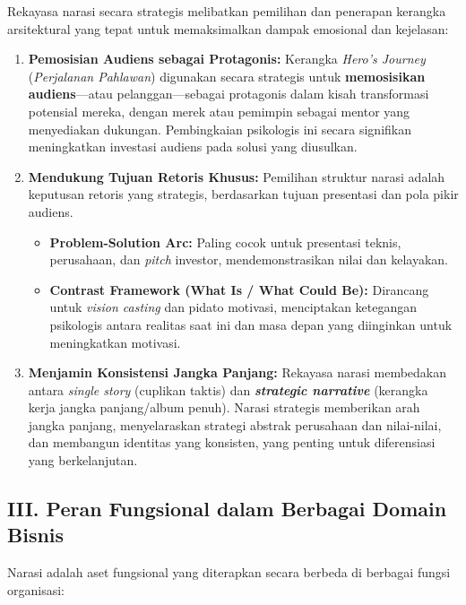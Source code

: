 \documentclass[
  letterpaper,
  DIV=11,
  numbers=noendperiod]{scrreprt}
\providecommand{\tightlist}{%
  \setlength{\itemsep}{0pt}\setlength{\parskip}{0pt}}
\begin{document}
Rekayasa narasi secara strategis melibatkan pemilihan dan penerapan
kerangka arsitektural yang tepat untuk memaksimalkan dampak emosional
dan kejelasan:

\begin{enumerate}
\def\labelenumi{\arabic{enumi}.}
\tightlist
\item
  \textbf{Pemosisian Audiens sebagai Protagonis:} Kerangka \emph{Hero's
  Journey} (\emph{Perjalanan Pahlawan}) digunakan secara strategis untuk
  \textbf{memosisikan audiens}---atau pelanggan---sebagai protagonis
  dalam kisah transformasi potensial mereka, dengan merek atau pemimpin
  sebagai mentor yang menyediakan dukungan. Pembingkaian psikologis ini
  secara signifikan meningkatkan investasi audiens pada solusi yang
  diusulkan.
\item
  \textbf{Mendukung Tujuan Retoris Khusus:} Pemilihan struktur narasi
  adalah keputusan retoris yang strategis, berdasarkan tujuan presentasi
  dan pola pikir audiens.

  \begin{itemize}
  \tightlist
  \item
    \textbf{Problem-Solution Arc:} Paling cocok untuk presentasi teknis,
    perusahaan, dan \emph{pitch} investor, mendemonstrasikan nilai dan
    kelayakan.
  \item
    \textbf{Contrast Framework (What Is / What Could Be):} Dirancang
    untuk \emph{vision casting} dan pidato motivasi, menciptakan
    ketegangan psikologis antara realitas saat ini dan masa depan yang
    diinginkan untuk meningkatkan motivasi.
  \end{itemize}
\item
  \textbf{Menjamin Konsistensi Jangka Panjang:} Rekayasa narasi
  membedakan antara \emph{single story} (cuplikan taktis) dan
  \textbf{\emph{strategic narrative}} (kerangka kerja jangka
  panjang/album penuh). Narasi strategis memberikan arah jangka panjang,
  menyelaraskan strategi abstrak perusahaan dan nilai-nilai, dan
  membangun identitas yang konsisten, yang penting untuk diferensiasi
  yang berkelanjutan.
\end{enumerate}

\subsection{III. Peran Fungsional dalam Berbagai Domain
Bisnis}\label{iii.-peran-fungsional-dalam-berbagai-domain-bisnis}

Narasi adalah aset fungsional yang diterapkan secara berbeda di berbagai
fungsi organisasi:
\end{document}
